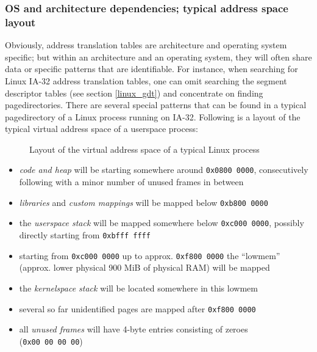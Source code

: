 \subsubsection{OS and architecture dependencies; typical address space layout}

\label{ATTguess} Obviously, address translation tables are architecture and
operating system specific; but within an architecture and an operating system,
they will often share data or specific patterns that are identifiable. For
instance, when searching for Linux IA-32 address translation tables, one can
omit searching the segment descriptor tables (see section \ref{linux_gdt}) and
concentrate on finding pagedirectories. There are several special patterns that
can be found in a typical pagedirectory of a Linux process running on IA-32.
Following is a layout of the typical virtual address space of a userspace
process:

\begin{figure}[ht] \begin{center}

	\epsfysize 9.5cm


	\caption{Layout of the virtual address space of a typical Linux process}

	\label{fig:linux_virtual_address_space}

\end{center}\end{figure}


\begin{itemize}

	\item \emph{code and heap} will be starting somewhere around
	\texttt{0x0800~0000}, consecutively following with a minor number of
	unused frames in between

	\item \emph{libraries} and \emph{custom mappings} will be mapped below
	\texttt{0xb800~0000}

	\item the \emph{userspace stack} will be mapped somewhere below
	\texttt{0xc000~0000}, possibly directly starting from
	\texttt{0xbfff~ffff}

	\item starting from \texttt{0xc000~0000} up to approx.
	\texttt{0xf800~0000} the ``lowmem'' (approx. lower physical 900 MiB of
	physical RAM) will be mapped

	\item the \emph{kernelspace stack} will be located somewhere in this
	lowmem

	\item several so far unidentified pages are mapped after
	\texttt{0xf800~0000}

	\item all \emph{unused frames} will have 4-byte entries consisting of
	zeroes (\texttt{0x00~00~00~00})

\end{itemize}

